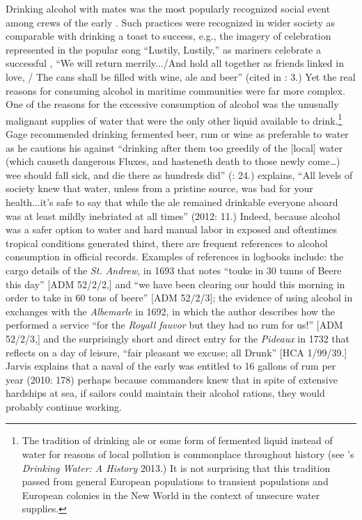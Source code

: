 Drinking alcohol with  mates was the most popularly recognized social event among crews of the early . Such practices were recognized in wider society as comparable with drinking a toast to success, e.g., the imagery of celebration represented in the popular song “Lustily, Lustily,” as mariners celebrate a successful , “We will return merrily.../And hold all together as friends linked in love, / The cans shall be filled with wine, ale and beer” (cited in \citealt{Palmer1986}: 3.) Yet the real reasons for consuming alcohol in maritime communities were far more complex. One of the reasons for the excessive consumption of alcohol was the unusually malignant supplies of water that were the only other liquid available to drink.\footnote{The tradition of drinking ale or some form of fermented liquid instead of water for reasons of local pollution is commonplace throughout history (see \citeauthor{Salzman2013}’s \textit{Drinking Water: A History} 2013.) It is not surprising that this tradition passed from general European populations to transient populations and European colonies in the New World in the context of unsecure water supplies.}  Gage recommended drinking fermented beer, rum or wine as preferable to water as he cautions his  against “drinking after them too greedily of the [local] water (which causeth dangerous Fluxes, and hasteneth death to those newly come…) wee should fall sick, and die there as hundreds did” (\citealt{Gage1648}: 24.) \citeauthor{Bicheno2012} explains, “All levels of society knew that water, unless from a pristine source, was bad for your health...it’s safe to say that while the ale remained drinkable everyone aboard was at least mildly inebriated at all times” (2012: 11.) Indeed, because alcohol was a safer option to water and hard manual labor in exposed and oftentimes tropical conditions generated thirst, there are frequent references to alcohol consumption in official records. Examples of references in logbooks include: the cargo details of the \textit{St. Andrew}, in 1693 that notes “touke in 30 tunns of Beere this day” [ADM 52/2/2,] and “we have been clearing our hould this morning in order to take in 60 tons of beere” [ADM 52/2/3]; the evidence of using alcohol in  exchanges with the \textit{Albemarle} in 1692, in which the author describes how the  performed a service “for the \textit{Royall fauvor} but they had no rum for us!” [ADM 52/2/3,] and the surprisingly short and direct entry for the \textit{Pideaux} in 1732 that reflects on a day of leisure, “fair pleasant we excuse; all Drunk” [HCA 1/99/39.] Jarvis explains that a naval  of the early  was entitled to 16 gallons of rum per year (2010: 178) perhaps because commanders knew that in spite of extensive hardships at sea, if sailors could maintain their alcohol rations, they would probably continue working. 

